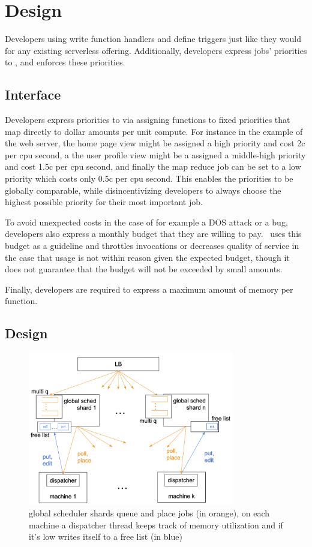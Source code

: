 \section{Design}\label{design}


Developers using \sys{} write function handlers and define triggers just like
they would for any existing serverless offering. Additionally, developers
express jobs' priorities to \sys{}, and \sys{} enforces these priorities.



\subsection{Interface}

Developers express priorities to \sys{} via assigning functions to fixed
priorities that map directly to dollar amounts per unit compute. For instance in
the example of the web server, the home page view might be assigned a high
priority and cost 2c per cpu second, a the user profile view might be a assigned
a middle-high priority and cost 1.5c per cpu second, and finally the map reduce
job can be set to a low priority which costs only 0.5c per cpu second. This
enables the priorities to be globally comparable, while disincentivizing
developers to always choose the highest possible priority for their most
important job.
 
To avoid unexpected costs in the case of for example a DOS attack or a bug,
developers also express a monthly budget that they are willing to pay.\ \sys{}
uses this budget as a guideline and throttles invocations or decreases quality
of service in the case that usage is not within reason given the expected
budget, though it does not guarantee that the budget will not be exceeded by
small amounts.

Finally, developers are required to express a maximum amount of memory per
function.



\subsection{\sys{} Design}

\begin{figure}[t]
    \centering
      \includegraphics[width=9cm]{img/overview.png}
      \caption{ global scheduler shards queue and place jobs (in orange), 
      on each machine a dispatcher thread keeps track of memory utilization 
      and if it's low writes itself to a free list (in blue) }
    \label{fig:overview}
\end{figure}
  


